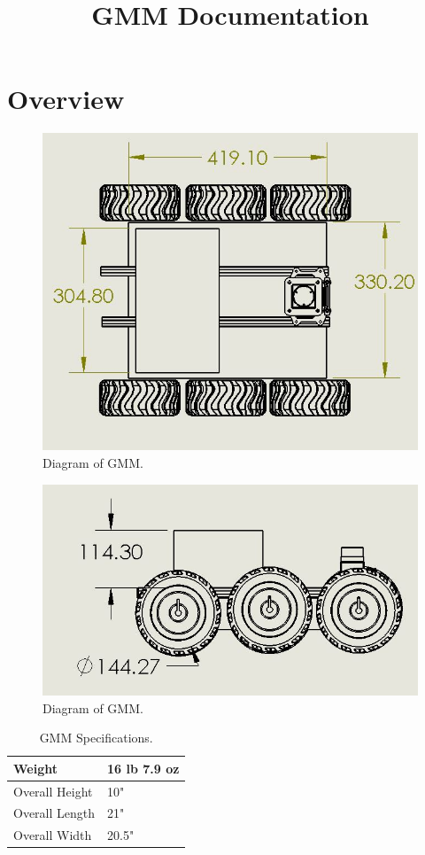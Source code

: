 \documentclass[letterpaper,12pt]{report}
\begin{document}
\title{GMM Documentation}
\maketitle

\tableofcontents
\chapter{Overview}

\begin{figure}[h]
	\centering
	\includegraphics[width=1\textwidth]{GMMtop.jpg}
	\caption{Diagram of GMM.}
	\label{Figure 1:}
\end{figure}

\begin{figure}[h]
	\centering
	\includegraphics[width=1\textwidth]{GMMside.jpg}
	\caption{Diagram of GMM.}
	\label{Figure 1:}
\end{figure}
\begin{table}
\begin{tabular}{| l | l |}
 		\hline
 		Weight & 16 lb 7.9 oz  \\ \hline
 		Overall Height & 10" \\ \hline
 		Overall Length & 21" \\ \hline
 		Overall Width & 20.5"\\ \hline
	\end{tabular}
	\caption{GMM Specifications.}
\end{table}
\end{document}
